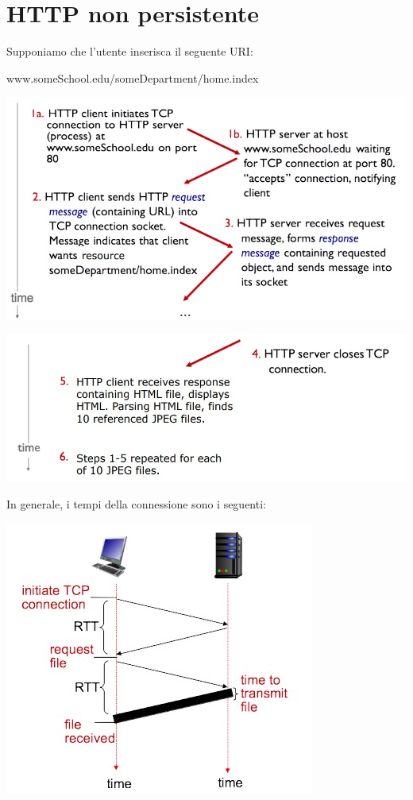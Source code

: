 \section{HTTP non persistente}
Supponiamo che l'utente inserisca il seguente URI:
\begin{center}
    www.someSchool.edu/someDepartment/home.index
\end{center}
\begin{center}
\includegraphics[scale=0.4]{Images/TecnologieWeb/1/NonPersistentHTTP1.jpg}    
\end{center}
\begin{center}
\includegraphics[scale=0.39]{Images/TecnologieWeb/1/NonPersistentHTTP2.jpg}    
\end{center}
In generale, i tempi della connessione sono i seguenti:
\begin{center}
\includegraphics[scale=0.4]{Images/TecnologieWeb/1/RTT.jpg}    
\end{center}
